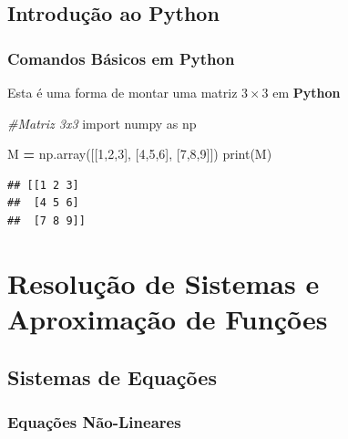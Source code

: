 \documentclass[
]{book}
\newenvironment{Shaded}{\begin{snugshade}}{\end{snugshade}}
\newcommand{\BuiltInTok}[1]{#1}
\newcommand{\CommentTok}[1]{\textcolor[rgb]{0.56,0.35,0.01}{\textit{#1}}}
\newcommand{\DecValTok}[1]{\textcolor[rgb]{0.00,0.00,0.81}{#1}}
\newcommand{\ImportTok}[1]{#1}
\newcommand{\NormalTok}[1]{#1}
\newcommand{\OperatorTok}[1]{\textcolor[rgb]{0.81,0.36,0.00}{\textbf{#1}}}
\begin{document}
\hypertarget{cross}{%
\chapter{Introdução ao Python}\label{cross}}

\hypertarget{comandos-buxe1sicos-em-python}{%
\section{Comandos Básicos em Python}\label{comandos-buxe1sicos-em-python}}

Esta é uma forma de montar uma matriz \(3 \times 3\) em \textbf{Python}

\begin{Shaded}
\begin{Highlighting}[]
\CommentTok{\#Matriz 3x3}
\ImportTok{import}\NormalTok{ numpy }\ImportTok{as}\NormalTok{ np}

\NormalTok{M }\OperatorTok{=}\NormalTok{ np.array([[}\DecValTok{1}\NormalTok{,}\DecValTok{2}\NormalTok{,}\DecValTok{3}\NormalTok{],}
\NormalTok{              [}\DecValTok{4}\NormalTok{,}\DecValTok{5}\NormalTok{,}\DecValTok{6}\NormalTok{],}
\NormalTok{              [}\DecValTok{7}\NormalTok{,}\DecValTok{8}\NormalTok{,}\DecValTok{9}\NormalTok{]])}
\BuiltInTok{print}\NormalTok{(M)}
\end{Highlighting}
\end{Shaded}

\begin{verbatim}
## [[1 2 3]
##  [4 5 6]
##  [7 8 9]]
\end{verbatim}

\hypertarget{part-resoluuxe7uxe3o-de-sistemas-e-aproximauxe7uxe3o-de-funuxe7uxf5es}{%
\part{Resolução de Sistemas e Aproximação de Funções}\label{part-resoluuxe7uxe3o-de-sistemas-e-aproximauxe7uxe3o-de-funuxe7uxf5es}}

\hypertarget{sistemas-de-equauxe7uxf5es}{%
\chapter{Sistemas de Equações}\label{sistemas-de-equauxe7uxf5es}}

\hypertarget{equauxe7uxf5es-nuxe3o-lineares}{%
\section{Equações Não-Lineares}\label{equauxe7uxf5es-nuxe3o-lineares}}
\end{document}
